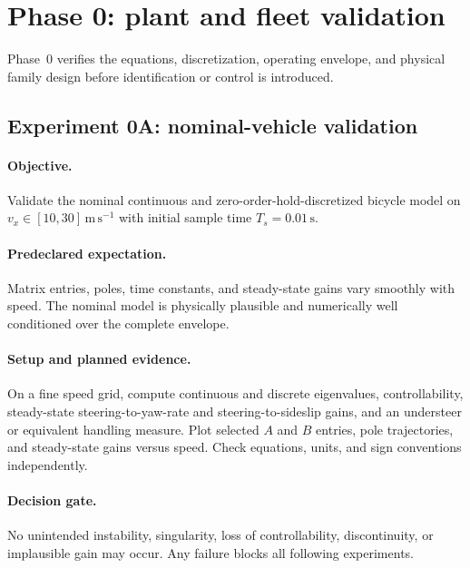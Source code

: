 \section{Phase 0: plant and fleet validation}
\label{sec:phase0}
Phase~0 verifies the equations, discretization, operating envelope, and physical
family design before identification or control is introduced.

\subsection{Experiment 0A: nominal-vehicle validation}
\paragraph{Objective.}
Validate the nominal continuous and zero-order-hold-discretized bicycle model on
$v_x\in[10,30]\,\mathrm{m\,s^{-1}}$ with initial sample time
$T_s=0.01\,\mathrm{s}$.

\paragraph{Predeclared expectation.}
Matrix entries, poles, time constants, and steady-state gains vary smoothly with
speed. The nominal model is physically plausible and numerically well conditioned
over the complete envelope.

\paragraph{Setup and planned evidence.}
On a fine speed grid, compute continuous and discrete eigenvalues, controllability,
steady-state steering-to-yaw-rate and steering-to-sideslip gains, and an understeer
or equivalent handling measure. Plot selected $A$ and $B$ entries, pole
trajectories, and steady-state gains versus speed. Check equations, units, and sign
conventions independently.

\paragraph{Decision gate.}
No unintended instability, singularity, loss of controllability, discontinuity,
or implausible gain may occur. Any failure blocks all following experiments.

